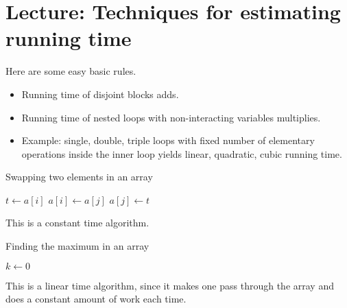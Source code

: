\chapter{Lecture: Techniques for estimating running time}

Here are some easy basic rules.
\begin{itemize}
\item Running time of disjoint blocks adds.
\item Running time of nested  loops with non-interacting variables multiplies.
\item Example: single, double, triple loops with fixed number of elementary operations inside the inner loop yields linear, quadratic, cubic running time.
\end{itemize}




\begin{Example}
\begin{algorithm}[H]
  \caption{Swapping two elements in an array
    \label{alg:swap}}
\begin{algorithmic}[0]
\State $t \gets a[i]$
\State $a[i] \gets a[j]$
\State $a[j] \gets t$
\State {}
\EndFunction
\end{algorithmic}
\end{algorithm}

This is a constant time algorithm.
\end{Example}


\begin{Example}
\begin{algorithm}[H]
  \caption{Finding the maximum in an array
    \label{alg:findmax}}
\begin{algorithmic}[0]
\State $k \gets 0$ 
\EndIf
\EndFor
\State {}
\EndFunction
\end{algorithmic}
\end{algorithm}

This is a linear time algorithm, since it makes one pass through the array and does a constant amount of work each time.
\end{Example}



